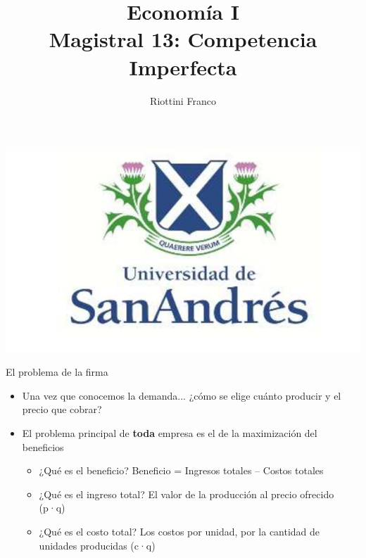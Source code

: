 \documentclass{beamer}
\title[Economía I]{Economía I \vspace{4mm}
\\ Magistral 13: Competencia Imperfecta}
\date{}
\author[Riottini]{Riottini Franco}
\institute[]{Universidad de San Andrés}
\begin{document}
\begin{frame}
    \titlepage
    \centering
    \includegraphics[scale=0.2]{../Figures/logoUDESA.jpg} 
\end{frame}


\begin{frame}{El problema de la firma}
    \begin{itemize}
        \item Una vez que conocemos la demanda... ¿cómo se elige cuánto producir y el precio que cobrar?
        \item El problema principal de \textbf{toda} empresa es el de la maximización del beneficios
        \begin{itemize}
            \item ¿Qué es el beneficio? Beneficio = Ingresos totales – Costos totales
            \item ¿Qué es el ingreso total? El valor de la producción al precio ofrecido (p·q)
            \item ¿Qué es el costo total? Los costos por unidad, por la cantidad de unidades producidas (c·q)
        \end{itemize}
    \end{itemize}
\end{frame}
\end{document}
